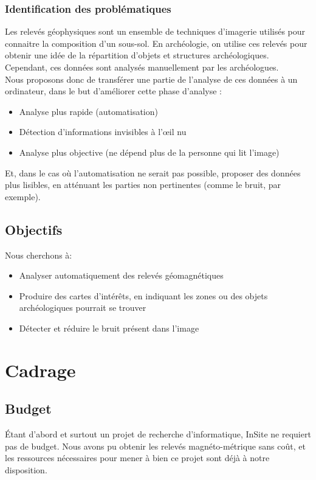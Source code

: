 \documentclass[a4paper, 12pt, titlepage, oneside, french]{article}
\begin{document}
		\subsubsection{Identification des problématiques}
		Les relevés géophysiques sont un ensemble de techniques d'imagerie utilisés pour connaitre la composition d'un sous-sol.
		En archéologie, on utilise ces relevés pour obtenir une idée de la répartition d'objets et structures archéologiques.
		Cependant, ces données sont analysés manuellement par les archéologues. \\
		Nous proposons donc de transférer une partie de l'analyse de ces données à un ordinateur, dans le but d'améliorer cette phase d'analyse :
		\begin{itemize}
			\item Analyse plus rapide (automatisation)
			\item Détection d'informations invisibles à l'œil nu
			\item Analyse plus objective (ne dépend plus de la personne qui lit l'image)
		\end{itemize}
		Et, dans le cas où l'automatisation ne serait pas possible, proposer des données plus lisibles, en atténuant les parties non pertinentes (comme le bruit, par exemple).


	\subsection{Objectifs}%
	Nous cherchons à:
	\begin{itemize}
		\item Analyser automatiquement des relevés géomagnétiques 
		\item Produire des cartes d'intérêts, en indiquant les zones ou des objets archéologiques pourrait se trouver
		\item Détecter et réduire le bruit présent dans l'image
	\end{itemize}

	\newpage

\section{Cadrage}
	\subsection{Budget}
	Étant d'abord et surtout un projet de recherche d'informatique, InSite ne requiert pas de budget. Nous avons pu obtenir les relevés magnéto-métrique sans coût, et les ressources nécessaires pour mener à bien ce projet sont déjà à notre disposition. 
\end{document}
